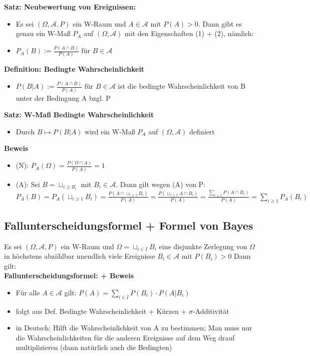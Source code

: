 \documentclass[a4paper,11pt]{scrartcl}
\begin{document}
\textbf{Satz: Neubewertung von Ereignissen:}
\begin{itemize}
    \item Es sei $(\Omega, \mathcal{A}, P)$ ein W-Raum und $A \in \mathcal{A}$ mit $P(A) > 0$. Dann gibt es genau ein W-Maß $P_A$ auf $(\Omega, \mathcal{A})$ mit den Eigenschaften (1) + (2), nämlich:
    \item $P_A(B) := \frac{P(A \cap B)}{P(A)}$ für $B \in \mathcal{A}$
\end{itemize}

\textbf{Definition: Bedingte Wahrscheinlichkeit}
\begin{itemize}
    \item $P(B|A) := \frac{P(A \cap B)}{P(A)}$ für $B \in \mathcal{A}$ ist die bedingte Wahrscheinlichkeit von B unter der Bedingung A bzgl. P
\end{itemize}

\textbf{Satz: W-Maß Bedingte Wahrscheinlichkeit}
\begin{itemize}
    \item Durch $ B \mapsto P(B|A)$ wird ein W-Maß $P_A$ auf $(\Omega, \mathcal{A})$ definiert
\end{itemize}
\textbf{Beweis}
\begin{itemize}
    \item (N): $P_A(\Omega) = \frac{P(\Omega \cap A)}{P(A)} = 1$
    \item (A): Sei $B = \sqcup_{i \geq B_i}$ mit $B_i \in \mathcal{A}$. Dann gilt wegen (A) von P:
    $P_A(B) = P_A(\sqcup_{i \geq 1} B_i) = \frac{P(A \cap \sqcup_{i \geq 1} B_i)}{P(A)} = \frac{P(\sqcup_{i \geq 1} A \cap B_i)}{P(A)} = \frac{\sum_{i \geq 1} P(A \cap B_i)}{P(A)} = \sum_{i \geq 1} P_A(B_i)$
\end{itemize}


\subsection{Fallunterscheidungsformel + Formel von Bayes}

Es sei $(\Omega,\mathcal{A},P)$ ein W-Raum und $\Omega = \sqcup_{i\in I} B_i$ eine disjunkte Zerlegung von $\Omega$ in höchstens abzählbar unendlich viele Ereignisse $B_i \in \mathcal{A}$ mit $P(B_i) > 0$ Dann gilt: \\

\textbf{Fallunterscheidungsformel: + Beweis}
\begin{itemize}
    \item Für alle $ A \in \mathcal{A}$ gilt:
    $P(A) = \sum_{i \in I} P(B_i) \cdot P(A|B_i)$
    \item folgt aus Def. Bedingte Wahrscheinlichkeit + Kürzen + $\sigma$-Additivität
    \item in Deutsch: Hilft die Wahrscheinlichkeit von A zu bestimmen; Man muss nur die Wahrscheinlichkeiten für die anderen Ereignisse auf dem Weg drauf multiplizieren (dann natürlich auch die Bedingten)
\end{itemize}
\end{document}
